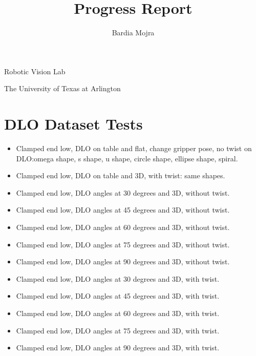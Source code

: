 \documentclass[11pt]{article}
\title{Progress Report}
\author{Bardia Mojra}
\begin{document}
\maketitle
\thispagestyle{empty}

\bigskip
\bigskip
\begin{center}
 Robotic Vision Lab
\end{center}

\begin{center}
The University of Texas at Arlington
\end{center}

\newpage


\section{DLO Dataset Tests}
\begin{itemize}
  \item Clamped end low, DLO on table and flat, change gripper pose, no
  twist on DLO:\@ omega shape, s shape, u shape, circle shape, ellipse shape,
  spiral.
  \item Clamped end low, DLO on table and 3D, with twist: same shapes.
  \item Clamped end low, DLO angles at 30 degrees and 3D, without twist.
  \item Clamped end low, DLO angles at 45 degrees and 3D, without twist.
  \item Clamped end low, DLO angles at 60 degrees and 3D, without twist.
  \item Clamped end low, DLO angles at 75 degrees and 3D, without twist.
  \item Clamped end low, DLO angles at 90 degrees and 3D, without twist.
  \item Clamped end low, DLO angles at 30 degrees and 3D, with twist.
  \item Clamped end low, DLO angles at 45 degrees and 3D, with twist.
  \item Clamped end low, DLO angles at 60 degrees and 3D, with twist.
  \item Clamped end low, DLO angles at 75 degrees and 3D, with twist.
  \item Clamped end low, DLO angles at 90 degrees and 3D, with twist.
\end{itemize}
\end{document}
